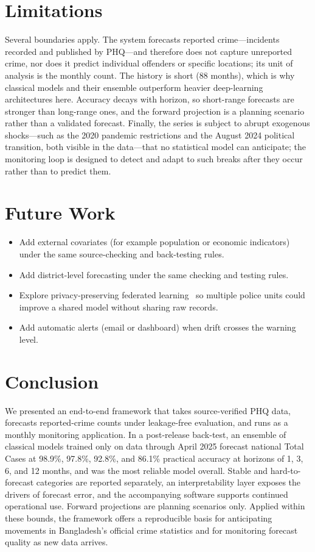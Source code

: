 \documentclass[conference]{IEEEtran}
\begin{document}
\section{Limitations}
\label{sec:limitations}
Several boundaries apply. The system forecasts reported crime---incidents recorded and published by
PHQ---and therefore does not capture unreported crime, nor does it predict individual offenders or
specific locations; its unit of analysis is the monthly count. The history is short (88 months),
which is why classical models and their ensemble outperform heavier deep-learning architectures
here. Accuracy decays with horizon, so short-range forecasts are stronger than long-range ones, and
the forward projection is a planning scenario rather than a validated forecast. Finally, the series
is subject to abrupt exogenous shocks---such as the 2020 pandemic restrictions and the August 2024
political transition, both visible in the data---that no statistical model can anticipate; the
monitoring loop is designed to detect and adapt to such breaks after they occur rather than to
predict them.

\section{Future Work}
\begin{itemize}
  \item Add external covariates (for example population or economic indicators) under the same
        source-checking and back-testing rules.
  \item Add district-level forecasting under the same checking and testing rules.
  \item Explore privacy-preserving federated learning~\cite{mcmahan2017fl,kairouz2021fl} so multiple
        police units could improve a shared model without sharing raw records.
  \item Add automatic alerts (email or dashboard) when drift crosses the warning level.
\end{itemize}

\section{Conclusion}
We presented an end-to-end framework that takes source-verified PHQ data, forecasts reported-crime
counts under leakage-free evaluation, and runs as a monthly monitoring application. In a
post-release back-test, an ensemble of classical models trained only on data through April 2025
forecast national Total Cases at 98.9\%, 97.8\%, 92.8\%, and 86.1\% practical accuracy at horizons
of 1, 3, 6, and 12 months, and was the most reliable model overall. Stable and hard-to-forecast
categories are reported separately, an interpretability layer exposes the drivers of forecast
error, and the accompanying software supports continued operational use. Forward projections are
planning scenarios only. Applied within these bounds, the framework offers a reproducible basis for
anticipating movements in Bangladesh's official crime statistics and for monitoring forecast
quality as new data arrives.
\end{document}
